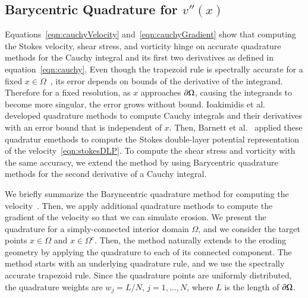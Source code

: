\documentclass[preprint, 10pt]{elsarticle}
\begin{document}
\subsection{Barycentric Quadrature for $v''(x)$}
\label{sec:bary}
Equations~\eqref{eqn:cauchyVelocity} and~\eqref{eqn:cauchyGradient} show
that computing the Stokes velocity, shear stress, and vorticity hinge on
accurate quadrature methods for the Cauchy integral and its first two
derivatives as defined in equation~\eqref{eqn:cauchy}.  Even though the
trapezoid rule is spectrally accurate for a fixed $x \in
\Omega$~\cite{tre-wei2014}, its error depends on bounds of the
derivative of the integrand.  Therefore for a fixed resolution, as $x$
approaches ${\partial}\Omega$, causing the integrands to become more singular,
the error grows without bound.  Ioakimidis et al.~\cite{ioa-pap-per1991}
developed quadrature methods to compute Cauchy integrals and their
derivatives with an error bound that is independent of $x$.  Then,
Barnett et al.~\cite{bar-wu-vee2015} applied these quadratur emethods to
compute the Stokes double-layer potential representation of the
velocity~\eqref{eqn:stokesDLP}.  To compute the shear stress and
vorticity with the same accuracy, we extend the method by using
Barycentric quadrature methods for the second derivative of a Cauchy
integral.  

We briefly summarize the Baryncentric quadrature method for computing
the velocity~\cite{bar-wu-vee2015}.  Then, we apply additional
quadrature methods to compute the gradient of the velocity so that we
can simulate erosion.  We present the quadrature for a simply-connected
interior domain $\Omega$, and we consider the target points $x \in
\Omega$ and $x \in \Omega^c$. Then, the method naturally extends to the
eroding geometry by applying the quadrature to each of its connected
component.  The method starts with an underlying quadrature rule, and we
use the spectrally accurate trapezoid rule.  Since the quadrature points
are uniformly distributed, the quadrature weights are $w_j = L/N$,
$j=1,\ldots,N$, where $L$ is the length of ${\partial}\Omega$.
\end{document}
